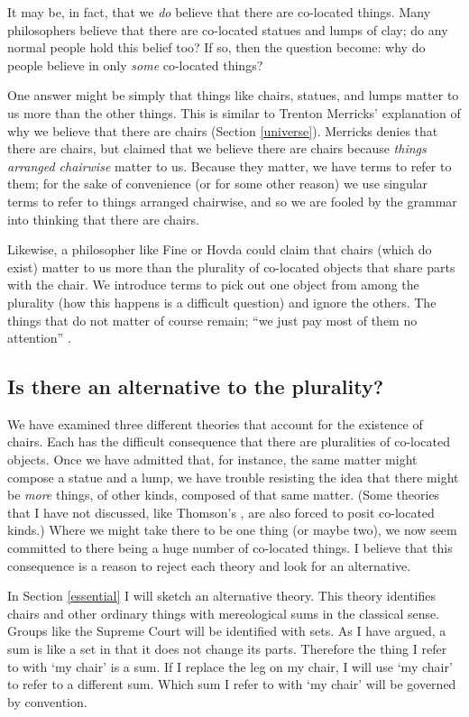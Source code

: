 \documentclass[11pt]{article}
\begin{document}
\begin{spacing}{1.5}
It may be, in fact, that we {\em do} believe that there are co-located
things.  Many philosophers believe that there are co-located statues
and lumps of clay; do any normal people hold this belief too?
If so, then the question become: why do people believe in only {\em
  some} co-located things?

One answer might be simply that things like chairs, statues, and lumps
matter to us more than the other things.  This is similar to Trenton
Merricks' explanation of why we believe that there are chairs (Section
\ref{universe}).  Merricks denies that there are chairs, but claimed
that we believe there are chairs because {\em things arranged
  chairwise} matter to us.  Because they matter, we have terms to
refer to them; for the sake of convenience (or for some other reason)
we use singular terms to refer to things arranged chairwise, and so we
are fooled by the grammar into thinking that there are chairs.

Likewise, a philosopher like Fine or Hovda could claim that chairs
(which do exist) matter to us more than the plurality of co-located
objects that share parts with the chair.  We introduce terms to pick
out one object from among the plurality (how this happens is a
difficult question) and ignore the others.  The things that do not
matter of course remain; ``we just pay most of them no attention''
\citep[356]{bennett2004}.

\subsection{Is there an alternative to the plurality?}
We have examined three different theories that account for the
existence of chairs.  Each has the difficult consequence that there
are pluralities of co-located objects.  Once we have admitted that,
for instance, the same matter might compose a statue and a lump, we
have trouble resisting the idea that there might be {\em more} things,
of other kinds, composed of that same matter.  (Some theories that I
have not discussed, like Thomson's \citeyearpar{thomson1998a}, are
also forced to posit co-located kinds.)  Where we might take there to
be one thing (or maybe two), we now seem committed to there being a
huge number of co-located things.  I believe that this consequence is
a reason to reject each theory and look for an alternative.

In Section \ref{essential} I will sketch an alternative theory.  This
theory identifies chairs and other ordinary things with mereological
sums in the classical sense.  Groups like the Supreme Court will be
identified with sets.  As I have argued, a sum is like a set in that
it does not change its parts.  Therefore the thing I refer to with `my
chair' is a sum.  If I replace the leg on my chair, I will use `my
chair' to refer to a different sum.  Which sum I refer to with `my
chair' will be governed by convention.

\ifstandalone
\end{spacing}


\fi
\end{document}
